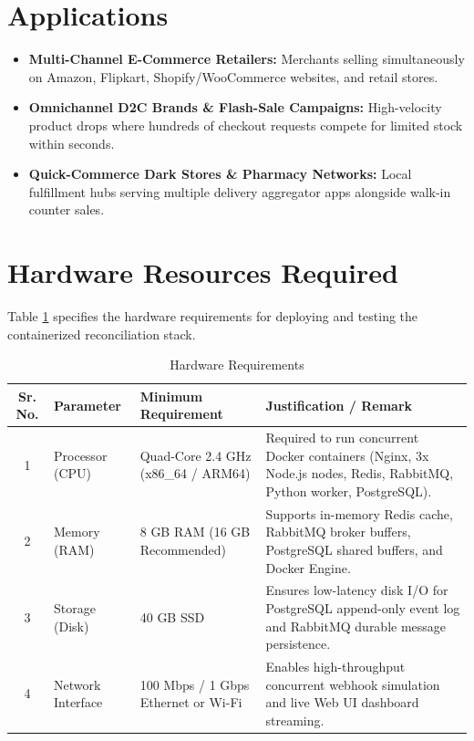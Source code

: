 \documentclass[oneside,a4paper,12pt]{report}
\begin{document}
\section{Applications}
\begin{itemize}
  \item \textbf{Multi-Channel E-Commerce Retailers:} Merchants selling simultaneously on Amazon, Flipkart, Shopify/WooCommerce websites, and retail stores.
  \item \textbf{Omnichannel D2C Brands \& Flash-Sale Campaigns:} High-velocity product drops where hundreds of checkout requests compete for limited stock within seconds.
  \item \textbf{Quick-Commerce Dark Stores \& Pharmacy Networks:} Local fulfillment hubs serving multiple delivery aggregator apps alongside walk-in counter sales.
\end{itemize}

\section{Hardware Resources Required}
Table \ref{tab:hreq} specifies the hardware requirements for deploying and testing the containerized reconciliation stack.

\begin{table}[!htbp]
\begin{center}
\renewcommand{\arraystretch}{1.4}
\begin{tabularx}{\textwidth}{|c|p{3.2cm}|p{3.8cm}|X|}
\hline
\textbf{Sr. No.} & \textbf{Parameter} & \textbf{Minimum Requirement} & \textbf{Justification / Remark} \\ \hline
1 & Processor (CPU) & Quad-Core 2.4 GHz (x86\_64 / ARM64) & Required to run concurrent Docker containers (Nginx, 3x Node.js nodes, Redis, RabbitMQ, Python worker, PostgreSQL). \\ \hline
2 & Memory (RAM) & 8 GB RAM (16 GB Recommended) & Supports in-memory Redis cache, RabbitMQ broker buffers, PostgreSQL shared buffers, and Docker Engine. \\ \hline
3 & Storage (Disk) & 40 GB SSD & Ensures low-latency disk I/O for PostgreSQL append-only event log and RabbitMQ durable message persistence. \\ \hline
4 & Network Interface & 100 Mbps / 1 Gbps Ethernet or Wi-Fi & Enables high-throughput concurrent webhook simulation and live Web UI dashboard streaming. \\ \hline
\end{tabularx}
\caption{Hardware Requirements}
\label{tab:hreq}
\end{center}
\end{table}
\end{document}
